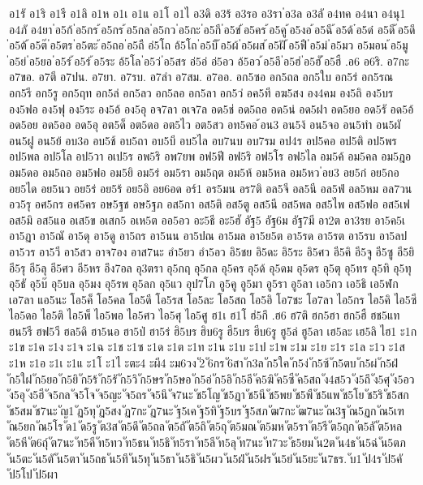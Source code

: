 {{อ1รั
อ1ริ
อ1รี
อ1ลิ
อ1ห
อ1เ
อ1แ
อ1โ
อ1ไ
อ3ดิ
อ3ร้
อ3รอ
อ3รา
่อ3ล
อ3ลั
อ4ทค
อ4นา
อ4นุ1
อ4ภั
อ4ยา
่อ5ก้
่อ5กร
้อ5กร
้อ5กล
่อ5กว
่อ5กะ
่อ5กี
่อ5ข่
้อ5คร
้อ5คู
้อ5งอ
้อ5ฉี
้อ5ด้
๋อ5ด๋
อ5ดี
้อ5ดึ
่อ5ต้
้อ5ต๊
่อ5ตร
่อ5ตะ
้อ5ถอ
่อ5ถื
อ่5โถ
อ้5โถ
่อ5บื
้อ5ผ้
่อ5ผส
้อ5ฝั
้อ5ฟื
่อ5ม่
่อ5มว
อ5มอน
้อ5มู
่อ5ย่
่อ5ยอ
่อ5ร่
้อ5ร่
้อ5ระ
อ้5โล
่อ5ว่
่อ5สร
อ่5อ่
อ่5อว
อ้5อว
้อ5อึ
่อ5ฮ่
่อ5ฮั
้อ5ฮื
.อ6
อ6ริ.
อ7กะ
อ7ขอ.
อ7ตี
อ7ปน.
อ7ยา.
อ7รบ.
อ7ลำ
อ7สม.
อ7ออ.
อก5ซอ
อก5ถล
อก5ใบ
อก5ร่
อก5รณ
อก5รี
อก5รู
อก5ฤท
อก5ล่
อก5ลว
อก5ลอ
อก5ลา
อก5ว่
อค5ที
อฆ5สง
อง4คม
อง5ถิ
อง5บร
อง5ฟอ
อง5ฟุ
อง5ระ
อง5อ้
อง5อุ
อจ7ลา
อเจ7ล
อด5ช่
อด5ถอ
อด5น่
อด5ฝา
อด5ยอ
อด5รั
อด5อ้
อด5อย
อด5ออ
อด5อุ
อต5ด็
อต5ดอ
อต5ไว
อต5สว
อท5คอ
้อน3
อน5ง้
อน5จอ
อน5ทำ
อน5ผั
อน5ฝู
อน5ย้
อบ3อ
อบ5ช้
อบ5ถา
อบ5บี
อบ5ไล
อบ7นบ
อบ7รม
อป4ร
อป5คอ
อป5ติ
อป5พร
อป5พล
อป5โล
อป5วา
อเป5ร
อพ5ริ
อพ7ยพ
อฟ5ฟี
อฟ5ริ
อฟ5โร
อฟ5ไล
อม5ค้
อม5คล
อม5ฎอ
อม5ดอ
อม5ถอ
อม5ฟอ
อม5ยิ
อม5ร่
อม5รา
อม5ฤต
อม5ห้
อม5หล
อม5หว
่อย3
อย5ก๋
อย5กอ
อย5ได
อย5นว
อย5ร่
อย5ร้
อย5อิ
อย6อด
อร์1
อร5มน
อร7ติ
อล5จี
อล5นี
อล5ฟ่
อล5หม
อล7วน
อว5รุ
อศ5กร
อศ5คร
อษ5ฐช
อษ5ฐภ
อส5กา
อส5ติ
อส5ตู
อส5นี
อส5พล
อส5ไพ
อส5ฟอ
อส5เฟ
อส5มิ
อส5แอ
อเส5ข
อเสก5
อเห5ต
ออ5อว
อะ5ธี
อะ5ฮั
อัฐ5
อัฐ6ม
อัฐ7มี
อา2ต
อา3รย
อา5ค5เ
อา5ฏา
อา5ณั
อา5ดุ
อา5ดู
อา5ถร
อา5นน
อา5ปณ
อา5มล
อา5ย5ต
อา5รด
อา5รต
อา5รบ
อา5ลป
อา5วร
อา5วี
อา5สว
อาจ7อง
อาส7นะ
อำ5ยว
อำ5อว
อิ5ชย
อิ5ดะ
อิ5ระ
อิ5ศว
อี5คิ
อี5จู
อี5ซู
อี5ยิ
อี5รุ
อี5ลุ
อี5ศว
อี5หร
อึง7อล
อุ3ตรา
อุ5กฤ
อุ5กล
อุ5คร
อุ5ด้
อุ5ดม
อุ5ดร
อุ5ตุ
อุ5ทร
อุ5ทิ
อุ5ทุ
อุ5ธั
อุ5บ๊
อุ5บล
อุ5มง
อุ5รพ
อุ5ลก
อุ5แว
อุป7โภ
อู5คู
อู5มา
อู5รา
อู5ลา
เอ5กว
เอ5ธิ
เอ5ฬก
เอ7ลา
แอ5นะ
โอ5ค็
โอ5คล
โอ5ดี
โอ5รส
โอ5ละ
โอ5สถ
โอ5อิ
โอ7ชะ
โอ7ลา
ไอ5กร
ไอ5คิ
ไอ5ซี
ไอ5ดอ
ไอ5ติ
ไอ5พ็
ไอ5พอ
ไอ5ศว
ไอ5ศุ
ไอ5ศู
ฮ1เ
ฮ1โ
ฮ่5กึ
.ฮ6
ฮ7ติ
ฮก5ฮา
ฮก5ฮื
ฮช5แท
ฮน5รี
ฮฟ5วี
ฮล5ดิ
ฮา5นอ
ฮา5ป่
ฮา5ร่
ฮิ5บร
ฮิบ6รู
ฮี5บร
ฮีบ6รู
ฮู5ล่
ฮู5ลา
เฮ5ละ
เฮ5ลิ
ไฮ1
ะ1ก
ะ1ข
ะ1ค
ะ1ง
ะ1จ
ะ1ฉ
ะ1ช
ะ1ซ
ะ1ด
ะ1ต
ะ1ท
ะ1น
ะ1บ
ะ1ป
ะ1พ
ะ1ม
ะ1ย
ะ1ร
ะ1ล
ะ1ว
ะ1ส
ะ1ห
ะ1อ
ะ1เ
ะ1แ
ะ1โ
ะ1ไ
ะตะ4
ะผี4
ะม6วง
ั2
ั6กร
ั6สา
ัก3ล
ัก5ใค
ัก5ง่
ัก5ซ้
ัก5ตบ
ัก5ผ่
ัก5ฝ่
ัก5ใฝ
ัก5ยอ
ัก5ยิ
ัก5ร้
ัก5รั
ัก5วิ
ัก5ษร
ัก5ษอ
ัก5อ่
ัก5อิ
ัก5อี
ัค5ฆิ
ัค5ซี
ัค5สถ
ัง4ส5ว
ัง5ถึ
ัง5ศุ
ัง5อว
ัง5อุ
ัง5ฮี
ัจ5กล
ัจ5โจ
ัจ5ญะ
ัจ5ถร
ัจ5นึ
ัจ7นะ
ัช5โญ
ัช5ฎา
ัช5นี
ัช5พย
ัช5พื
ัช5แพ
ัช5โย
ัช5ริ
ัช5สก
ัช5สม
ัช7นะ
ัญ1
ัฏ5ทุ
ัฏ5สง
ัฏ7กะ
ัฏ7นะ
ัฐ5เค
ัฐ5ทิ
ัฐ5บร
ัฐ5สภ
ัฒ7กะ
ัฒ7นะ
ัณ3ฐ
ัณ5ฏก
ัณ5เฑ
ัณ5ยก
ัณ5โร
ัด1
ัด5รู
ัต3ส
ัต5ดึ
ัต5ถล
ัต5ถั
ัต5ถิ
ัต5ถุ
ัต5มณ
ัต5มห
ัต5รา
ัต5รี
ัต5ฤก
ัต5ลั
ัต5หล
ัต5หี
ัต6ถุ์
ัต7นะ
ัท5คี
ัท5ทว
ัท5ธน
ัท5ธิ
ัท5รา
ัท5ลี
ัท5ลุ
ัท7นะ
ัท7วะ
ัธ5ยม
ัน2ต
ัน4ธ
ัน5ฉ่
ัน5ตภ
ัน5ตะ
ัน5ตั
ัน5ตา
ัน5ถธ
ัน5ทึ
ัน5ทุ
ัน5ธา
ัน5ธิ
ัน5ผว
ัน5ฝ่
ัน5ฝร
ัน5ย่
ัน5ยะ
ัน7ธร.
ับ1
ัป4ร
ัป5คั
ัป5โป
ัป5ผา
}}

